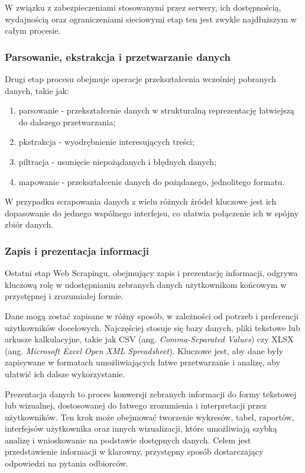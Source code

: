W związku z zabezpieczeniami stosowanymi przez serwery, ich dostępnością, wydajnością oraz ograniczeniami sieciowymi etap ten jest zwykle najdłuższym w całym procesie.

\subsubsection{Parsowanie, ekstrakcja i przetwarzanie danych}

Drugi etap procesu obejmuje operacje przekształcenia wcześniej pobranych danych, takie jak:
\begin{enumerate}
    \item parsowanie - przekształcenie danych w strukturalną reprezentację łatwiejszą do dalszego przetwarzania;
    \item pkstrakcja - wyodrębnienie interesujących treści;
    \item piltracja - usunięcie niepożądanych i błędnych danych;
    \item mapowanie - przekształcenie danych do pożądanego, jednolitego formatu.
\end{enumerate}

\noindent W przypadku scrapowania danych z wielu różnych źródeł kluczowe jest ich dopasowanie do jednego wspólnego interfejsu, co ułatwia połączenie ich w spójny zbiór danych.

\subsubsection{Zapis i prezentacja informacji}

Ostatni etap Web Scrapingu, obejmujący zapis i prezentację informacji, odgrywa kluczową rolę w udostępnianiu zebranych danych użytkownikom końcowym w przystępnej i zrozumiałej formie\cite{iee-state-of-the-art}.

Dane mogą zostać zapisane w różny sposób, w zależności od potrzeb i preferencji użytkowników docelowych.
Najczęściej stosuje się bazy danych, pliki tekstowe lub arkusze kalkulacyjne, takie jak CSV (ang. \emph{Comma-Separated Values}) czy XLSX (ang. \emph{Microsoft Excel Open XML Spreadsheet}).
Kluczowe jest, aby dane były zapisywane w formatach umożliwiających łatwe przetwarzanie i analizę, aby ułatwić ich dalsze wykorzystanie\cite{iee-state-of-the-art}.

Prezentacja danych to proces konwersji zebranych informacji do formy tekstowej lub wizualnej, dostosowanej do łatwego zrozumienia i interpretacji przez użytkowników.
Ten krok może obejmować tworzenie wykresów, tabel, raportów, interfejsów użytkownika oraz innych wizualizacji, które umożliwiają szybką analizę i wnioskowanie na podstawie dostępnych danych.
Celem jest przedstawienie informacji w klarowny, przystępny sposób dostarczający odpowiedzi na pytania odbiorców.

